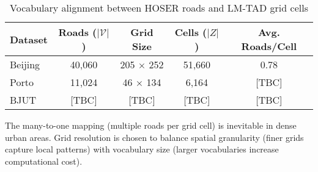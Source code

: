 \begin{table}[H]
    \centering
    \caption{Vocabulary alignment between HOSER roads and LM-TAD grid cells}
    \label{tab:vocab-alignment-appendix}
    \begin{tabular}{lcccc}
        \toprule
        \textbf{Dataset} & \textbf{Roads ($|\mathcal{V}|$)} & \textbf{Grid Size} & \textbf{Cells ($|Z|$)} & \textbf{Avg. Roads/Cell} \\
        \midrule
        Beijing          & 40,060                           & 205 $\times$ 252   & 51,660                 & 0.78                     \\
        Porto            & 11,024                           & 46 $\times$ 134    & 6,164                  & [TBC]                    \\
        BJUT             & [TBC]                            & [TBC]              & [TBC]                  & [TBC]                    \\
        \bottomrule
    \end{tabular}
\end{table}

The many-to-one mapping (multiple roads per grid cell) is inevitable in dense urban areas. Grid resolution is chosen to balance spatial granularity (finer grids capture local patterns) with vocabulary size (larger vocabularies increase computational cost).

